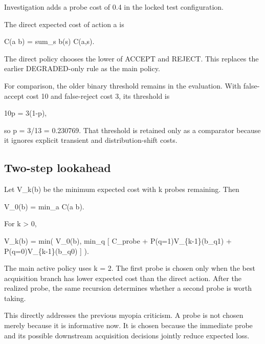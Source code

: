 \documentclass{article}
\begin{document}
\begin{table}[t]
\centering
\scriptsize
{}
\caption{State-aware action costs used by the main policy.}
\end{table}


Investigation adds a probe cost of 0.4 in the locked test configuration.

The direct expected cost of action a is

C(a \textbar{} b) = sum\_s b(s) C(a,s).

The direct policy chooses the lower of ACCEPT and REJECT. This replaces the earlier DEGRADED-only rule as the main policy.

For comparison, the older binary threshold remains in the evaluation. With false-accept cost 10 and false-reject cost 3, its threshold is

10p = 3(1-p),

so p = 3/13 = 0.230769. That threshold is retained only as a comparator because it ignores explicit transient and distribution-shift costs.

\subsection{Two-step lookahead}

Let V\_k(b) be the minimum expected cost with k probes remaining. Then

V\_0(b) = min\_a C(a \textbar{} b).

For k \textgreater{} 0,

V\_k(b) = min( V\_0(b), min\_q {[} C\_probe + P(q=1)V\_\{k-1\}(b\_q1) + P(q=0)V\_\{k-1\}(b\_q0) {]} ).

The main active policy uses k = 2. The first probe is chosen only when the best acquisition branch has lower expected cost than the direct action. After the realized probe, the same recursion determines whether a second probe is worth taking.

This directly addresses the previous myopia criticism. A probe is not chosen merely because it is informative now. It is chosen because the immediate probe and its possible downstream acquisition decisions jointly reduce expected loss.
\end{document}
